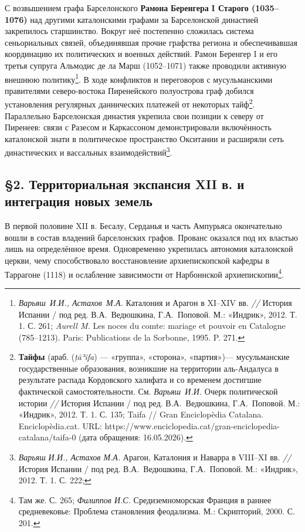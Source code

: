 С возвышением графа Барселонского \textbf{Рамона }\textbf{Беренгера}\textbf{ I Старого (1035--1076)} над другими каталонскими графами за Барселонской династией закрепилось старшинство. Вокруг неё постепенно сложилась система сеньориальных связей, объединявшая прочие графства региона и обеспечивавшая координацию их политических и военных действий. Рамон Беренгер I и его третья супруга Альмодис де ла Марш (1052--1071) также проводили активную внешнюю политику\footnote{\emph{Варьяш}\emph{~И.И., Астахов~М.А.} Каталония и Арагон в XI--XIV вв. \emph{// }История Испании / под ред. В.А.~Ведюшкина, Г.А.~Поповой. М.: «Индрик», 2012. Т. 1. С. 261; \emph{Aurell M.} Les noces du comte: mariage et pouvoir en Catalogne (785--1213). Paris: Publications de la Sorbonne, 1995. P. 271.}. В ходе конфликтов и переговоров с мусульманскими правителями северо-востока Пиренейского полуострова граф добился установления регулярных даннических платежей от некоторых тайф\footnote{\textbf{Тайфы} (араб. \textbf{} (\emph{{\unicodefallback ṭ}ā{\unicodefallback ʾ}ifa}) --- «группа», «сторона», «партия»)--- мусульманские государственные образования, возникшие на территории аль-Андалуса в результате распада Кордовского халифата и со временем достигшие фактической самостоятельности. См. \emph{Варьяш}\emph{~И.И.} Очерк политической истории \emph{// }История Испании / под ред. В.А.~Ведюшкина, Г.А.~Поповой. М.: «Индрик», 2012. Т. 1. С. 135; Taifa // Gran Enciclopèdia Catalana. Enciclopèdia.cat. URL: https://www.enciclopedia.cat/gran-enciclopedia-catalana/taifa-0 (дата обращения: 16.05.2026).}. Параллельно Барселонская династия укрепила свои позиции к северу от Пиренеев: связи с Разесом и Каркассоном демонстрировали включённость каталонской знати в политическое пространство Окситании и расширяли сеть династических и вассальных взаимодействий\footnote{\emph{Варьяш}\emph{ И.И., Астахов М.А.} Арагон, Каталония и Наварра в VIII--XI вв. \emph{// }История Испании / под ред. В.А.~Ведюшкина, Г.А.~Поповой. М.: «Индрик», 2012. Т. 1. С. 222;}.

\subsection*{§2. Территориальная экспансия XII в. и интеграция новых земель}

В первой половине XII в. Бесалу, Серданья и часть Ампурьяса окончательно вошли в состав владений барселонских графов. Прованс оказался под их властью лишь на определённое время. Одновременно укрепилась автономия каталонской церкви, чему способствовало восстановление архиепископской кафедры в Таррагоне (1118) и ослабление зависимости от Нарбоннской архиепископии\footnote{Там же. С. 265; \emph{Филиппов И.С.} Средиземноморская Франция в раннее средневековье: Проблема становления феодализма. М.: Скрипторий, 2000. С. 201.}.

